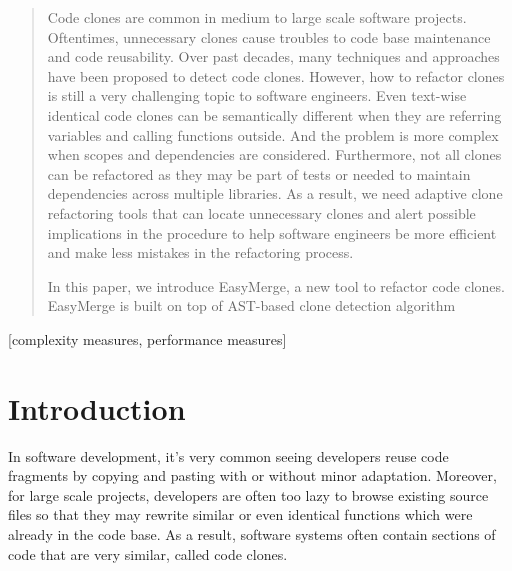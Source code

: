 \documentclass{acm_proc_article-sp}
\begin{document}
\maketitle
\begin{abstract}
Code clones are common in medium to large scale software projects. Oftentimes, unnecessary clones cause troubles to code base maintenance and code reusability. 
Over past decades, many techniques and approaches have been proposed to detect code clones. However, how to refactor clones is still a very challenging topic to software
engineers. Even text-wise identical code clones can be semantically different when they are referring variables and calling functions outside. And the problem is more 
complex when scopes and dependencies are considered. Furthermore, not all clones can be refactored as they may be part of tests or needed to maintain dependencies across multiple
libraries. As a result, we need adaptive clone refactoring tools that can locate unnecessary clones and alert possible implications in the procedure to help
software engineers be more efficient and make less mistakes in the refactoring process.

In this paper, we introduce EasyMerge, a new tool to refactor code clones. EasyMerge is built on top of AST-based clone detection algorithm
\end{abstract}

[complexity measures, performance measures]



\section{Introduction}
In software development, it's very common seeing developers reuse code fragments by copying and pasting with or without minor adaptation.
Moreover, for large scale projects, developers are often too lazy to browse existing source files so that they may rewrite similar or even identical functions which
were already in the code base. As a result, software systems often contain sections of code that are very similar, called code clones.
\end{document}
